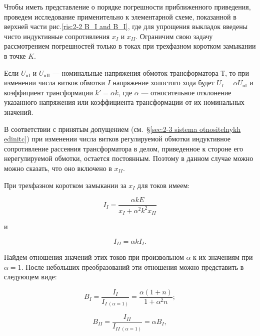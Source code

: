 \begin{small}
	\vspace{1pc}
	Чтобы иметь представление о порядке погрешности приближенного приведения, проведем исследование применительно к элементарной схеме, показанной в верхней части рис.\ref{ris:2-2 B_I and B_I}, где для упрощения выкладок введены чисто индуктивные сопротивления $ x_I $ и $ x_{II} $. Ограничим свою задачу рассмотрением погрешностей только в токах при трехфазном коротком замыкании в точке $ K $.
	
	Если $ U_{\text{нI}} $ и $ U_{\text{нII}} $ --- номинальные напряжения обмоток трансформатора $ Т $, то при изменении числа витков обмотки $ I $ напряжение холостого хода будет $ U_I = \alpha U_{\text{нI}} $ и коэффициент трансформации $ k'=\alpha k $, где $ \alpha $ --- относительное отклонение указанного напряжения или коэффициента трансформации от их номинальных значений.
	
	В соответствии с принятым допущением (см.~§\ref{sec:2-3 sistema otnositelnykh edinitc}) при изменении числа витков регулируемой обмотки индуктивное сопротивление рассеяния трансформатора в делом, приведенное к стороне его нерегулируемой обмотки, остается постоянным. Поэтому в данном случае можно можно сказать, что оно включено в $ x_{II} $.
	
	При трехфазном коротком замыкании за $ x_I $ для токов имеем:
	
	\begin{equation} %
		\label{eq:2-27 I_I_tok_pri_kz_za_xI}
		I_I = \frac{\alpha k E}{x_I + \alpha^2 k^2 x_{II}}
	\end{equation}
	
	и
	
	\begin{equation} %
		\label{eq:2-28 I_II_tok_pri_kz_za_xI}
		I_{II} = \alpha k I_I.
	\end{equation}
	
	Найдем отношения значений этих токов при произвольном $ \alpha $ к их значениям при $ \alpha = 1 $. После небольших преобразований эти отношения можно представить в следующем виде:
	
	\begin{equation} %
		\label{eq:2-29 B_I_otnoshenie_tokov}
		B_I = \frac{I_I}{I_{I~(\alpha=1)}} = \frac{\alpha(1+n)}{1+\alpha^2 n};
	\end{equation}
	
	\begin{equation} %
		\label{eq:2-30 B_II_otnoshenie_tokov}
		B_{II} = \frac{I_{II}}{I_{II~(\alpha=1)}} = \alpha B_I,
	\end{equation}


\end{small}
